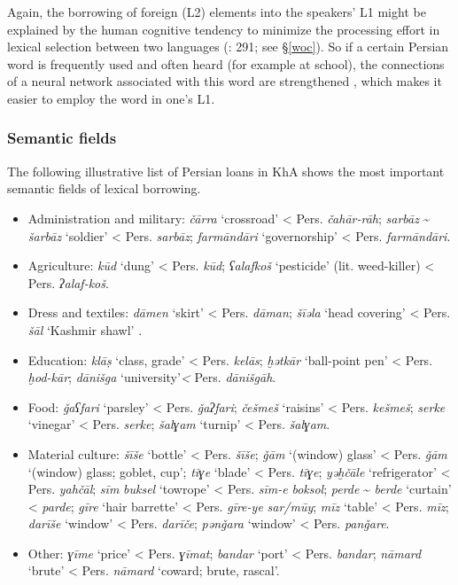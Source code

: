 \documentclass[output=paper,nonflat]{langsci/langscibook}
\begin{document}
Again, the borrowing of foreign (L2) elements into the speakers’ L1 might be explained by the human cognitive tendency to minimize the processing effort in lexical selection between two languages (\citealt{Lucas2012}: 291; see §\ref{woc}). So if a certain Persian word is frequently used and often heard (for example at school), the connections of a neural network associated with this word are strengthened \citep[291]{Lucas2012}, which makes it easier to employ the word in one’s L1. 


\subsubsection{Semantic fields}

The following illustrative list of Persian loans in KhA shows the most important semantic fields of lexical borrowing.

\begin{itemize} 
\item[] Administration and military: \textit{čārra} ‘crossroad’ < Pers. \textit{čahār-rāh}; \textit{sarbāz} \~{} \textit{šarbāz} ‘soldier’ < Pers. \textit{sarbāz}; \textit{farmāndāri} ‘governorship’ < Pers. \textit{farmān\-dāri}.
\item[] Agriculture: \textit{kūd} ‘dung’ < Pers. \textit{kūd}; \textit{ʕalafkoš} ‘pesticide' (lit. weed-killer) < Pers. \textit{ʔalaf-koš}. 
\item[] Dress and textiles: \textit{dāmen} ‘skirt’ < Pers. \textit{dāman}; \textit{šīəla} ‘head covering’ < Pers. \textit{šāl} ‘Kashmir shawl’ \citep[174]{Ingham2005}.
\item[] Education:  \textit{klāṣ} ‘class, grade’ < Pers. \textit{kelās}; \textit{ḫətkār} ‘ball-point pen’ < Pers. \textit{ḫod-kār}; \textit{dānišga} ‘university’\textit{<} Pers. \textit{dānišgāh}.
\item[] Food: \textit{ǧaʕfari} ‘parsley’ < Pers. \textit{ǧaʔfari}; \textit{češmeš} ‘raisins’ < Pers. \textit{kešmeš}; \textit{serke} ‘vinegar’ < Pers. \textit{serke}; \textit{šalɣam} ‘turnip’ < Pers. \textit{šalɣam}.
\item[] Material culture: \textit{šīše} ‘bottle’ < Pers. \textit{šīše}; \textit{ǧām} ‘(window) glass’ < Pers. \textit{ǧām} ‘(window) glass; goblet, cup'; \textit{tīɣe} ‘blade’ < Pers. \textit{tīɣe}; \textit{yəḫčāle} ‘refrigerator’ < Pers. \textit{yahčāl}; \textit{sīm} \textit{buksel} ‘towrope’ < Pers. \textit{sīm-e} \textit{boksol}; \textit{perde} \~{} \textit{berde} ‘curtain’ < \textit{parde}; \textit{gīre} ‘hair barrette’ < Pers. \textit{gīre-ye} \textit{sar/mūy}; \textit{mīz} ‘table’ < Pers. \textit{mīz}; \textit{darīše} ‘window’ < Pers. \textit{darīče}; \textit{pənǧara} ‘window’ < Pers. \textit{panǧare}.
\item[] Other: \textit{ɣīme} ‘price’ < Pers. \textit{ɣīmat}; \textit{bandar} ‘port’ < Pers. \textit{bandar}; \textit{nāmard} ‘brute’ < Pers. \textit{nāmard} `coward; brute, rascal'.
\end{itemize}
\end{document}
